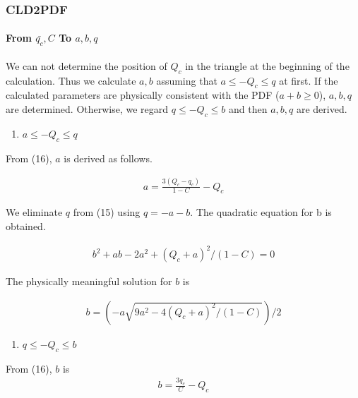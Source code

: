 \hypertarget{cld2pdf}{%
\subsubsection{CLD2PDF}\label{cld2pdf}}

\hypertarget{from-barq_c-c-to-abq}{%
\paragraph{\texorpdfstring{From \(\bar{q_c}, C\) To
\(a,b,q\)}{From \textbackslash bar\{q\_c\}, C To a,b,q}}\label{from-barq_c-c-to-abq}}

We can not determine the position of \(Q_c\) in the triangle at the
beginning of the calculation. Thus we calculate \(a,b\) assuming that
\(a \leq-Q_{c} \leq q\) at first. If the calculated parameters are
physically consistent with the PDF (\(a+b \ge 0\)), \(a,b,q\) are
determined. Otherwise, we regard \(q \leq-Q_{c} \leq b\) and then
\(a,b,q\) are derived.

\begin{enumerate}
\def\labelenumi{\arabic{enumi}.}
\tightlist
\item
  \(a \leq-Q_{c} \leq q\)
\end{enumerate}

From (16), \(a\) is derived as follows.

\begin{eqnarray}
a =\frac{3\left(Q_{c}-q_{c}\right)}{1-C}-Q_{c}
\end{eqnarray}

We eliminate \(q\) from (15) using \(q = -a-b\). The quadratic equation
for b is obtained.

\begin{eqnarray}
b^{2}+ab-2a^{2}+\left(Q_{c}+a\right)^{2} /(1-C)=0
\label{E08-17}
\end{eqnarray}

The physically meaningful solution for \(b\) is

\begin{eqnarray}
b=\left(-a\sqrt{9 a^{2}-4\left(Q_{c}+a\right)^{2} /(1-C)}\right) / 2
\label{E08-18}
\end{eqnarray}

\begin{enumerate}
\def\labelenumi{\arabic{enumi}.}
\setcounter{enumi}{1}
\tightlist
\item
  \(q \leq-Q_{c} \leq b\)
\end{enumerate}

From (16), \(b\) is \begin{eqnarray}
b=\frac{3 q_{c}}{C}-Q_{c}
\end{eqnarray}

